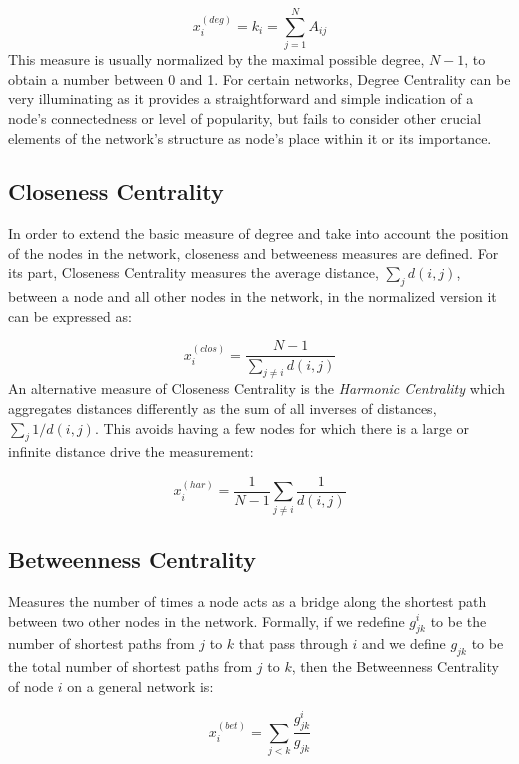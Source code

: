 \begin{equation}
    x_i^{(deg)}=k_i=\sum_{j=1}^{N}A_{ij}
\end{equation}
This measure is usually normalized by the maximal possible degree, $N − 1$, to obtain a number between 0 and 1. For certain networks, Degree Centrality can be very illuminating as it provides a straightforward and simple indication of a node's connectedness or level of popularity, but fails to consider other crucial elements of the network's structure as node's place within it or its importance.

\subsection*{Closeness Centrality} In order to extend the basic measure of degree and take into account the position of the nodes in the network, closeness and betweeness measures are defined. For its part, Closeness Centrality measures the average distance, $\sum_{j}^{}d(i,j)$, between a node and all other nodes in the network, in the normalized version it can be expressed as:

\begin{equation}
    x_i^{(clos)}= \frac{N-1}{\sum_{j\ne i}^{}d(i,j)}
\end{equation}
An alternative measure of Closeness Centrality is the \textit{Harmonic Centrality} which aggregates distances differently as the sum of all inverses
of distances, $\sum_{j}^{}1/d(i,j)$. This avoids having a few nodes for which there is a large or infinite distance drive the measurement:

\begin{equation}
    x_i^{(har)}= \frac{1}{N-1}\sum_{j\ne i}^{}\frac{1}{d(i,j)}
\end{equation}

\subsection*{Betweenness Centrality} Measures the number of times a node acts as a bridge along the shortest path between two other nodes in the network. Formally, if we redefine $g_{jk}^i$ to be the number of shortest paths from $j$ to $k$ that pass through $i$ and we define $g_{jk}$ to be the total number of shortest paths from $j$ to $k$, then the Betweenness Centrality of node $i$ on a general network is:

\begin{equation}
    x_i^{(bet)}= \sum_{j<k}^{}\frac{g_{jk}^i}{g_{jk}}
\end{equation}


